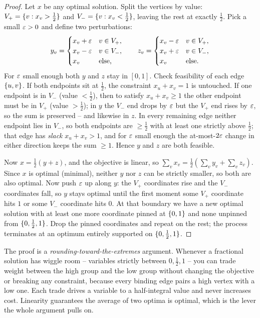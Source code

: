 \begin{proof}
Let $x$ be any optimal solution. Split the vertices by value:
$V_+=\{v:x_v>\tfrac12\}$ and $V_-=\{v:x_v<\tfrac12\}$, leaving the rest at
exactly $\tfrac12$. Pick a small $\varepsilon>0$ and define two perturbations:
\[
  y_v=\begin{cases} x_v+\varepsilon & v\in V_+,\\ x_v-\varepsilon & v\in V_-,\\ x_v & \text{else,}\end{cases}
  \qquad
  z_v=\begin{cases} x_v-\varepsilon & v\in V_+,\\ x_v+\varepsilon & v\in V_-,\\ x_v & \text{else.}\end{cases}
\]
For $\varepsilon$ small enough both $y$ and $z$ stay in $[0,1]$. Check feasibility of
each edge $\{u,v\}$. If both endpoints sit at $\tfrac12$, the constraint
$x_u+x_v=1$ is untouched. If one endpoint is in $V_-$ (value $<\tfrac12$), then
to satisfy $x_u+x_v\ge1$ the other endpoint must be in $V_+$ (value $>\tfrac12$);
in $y$ the $V_-$ end drops by $\varepsilon$ but the $V_+$ end rises by $\varepsilon$, so the
sum is preserved -- and likewise in $z$. In every remaining edge neither endpoint
lies in $V_-$, so both endpoints are $\ge\tfrac12$ with at least one strictly
above $\tfrac12$; that edge has \emph{slack} $x_u+x_v>1$, and for $\varepsilon$ small
enough the at-most-$2\varepsilon$ change in either direction keeps the sum $\ge1$. Hence
$y$ and $z$ are both feasible.

Now $x=\tfrac12(y+z)$, and the objective is linear, so
$\sum_v x_v=\tfrac12(\sum_v y_v+\sum_v z_v)$. Since $x$ is optimal (minimal),
neither $y$ nor $z$ can be strictly smaller, so both are also optimal. Now push
$\varepsilon$ up along $y$: the $V_+$ coordinates rise and the $V_-$ coordinates fall, so
$y$ stays optimal until the first moment some $V_+$ coordinate hits $1$ or some
$V_-$ coordinate hits $0$. At that boundary we have a new optimal solution with at
least one more coordinate pinned at $\{0,1\}$ and none unpinned from
$\{0,\tfrac12,1\}$. Drop the pinned coordinates and repeat on the rest; the
process terminates at an optimum entirely supported on $\{0,\tfrac12,1\}$.
\end{proof}

\begin{whybox}
The proof is a \emph{rounding-toward-the-extremes} argument. Whenever a
fractional solution has wiggle room -- variables strictly between
$0,\tfrac12,1$ -- you can trade weight between the high group and the low group
without changing the objective or breaking any constraint, because every binding
edge pairs a high vertex with a low one. Each trade drives a variable to a
half-integral value and never increases cost. Linearity guarantees the average of
two optima is optimal, which is the lever the whole argument pulls on.
\end{whybox}

